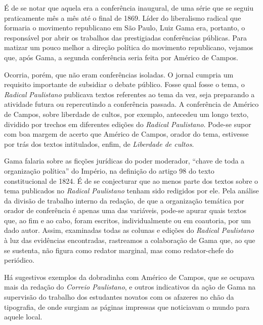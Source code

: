 É de se notar que aquela era a conferência inaugural, de uma série que
se seguiu praticamente mês a mês até o final de 1869. Líder do
liberalismo radical que formaria o movimento republicano em São Paulo,
Luiz Gama era, portanto, o responsável por abrir os trabalhos das
prestigiadas conferências públicas. Para matizar um pouco melhor a
direção política do movimento republicano, vejamos que, após Gama, a
segunda conferência seria feita por Américo de Campos.

Ocorria, porém, que não eram conferências isoladas. O jornal cumpria um
requisito importante de subsidiar o debate público. Fosse qual fosse o
tema, o \emph{Radical} \emph{Paulistano} publicava textos referentes ao
tema da vez, seja preparando a atividade futura ou repercutindo a
conferência passada. A conferência de Américo de Campos, sobre liberdade
de cultos, por exemplo, antecedeu um longo texto, dividido por trechos
em diferentes edições do \emph{Radical Paulistano}. Pode-se supor com
boa margem de acerto que Américo de Campos, orador do tema, estivesse
por trás dos textos intitulados, enfim, de \emph{Liberdade de cultos}.

Gama falaria sobre as ficções jurídicas do poder moderador, ``chave de
toda a organização política'' do Império, na definição do artigo 98 do
texto constitucional de 1824. É de se conjecturar que ao menos parte dos
textos sobre o tema publicados no \emph{Radical Paulistano} tenham sido
redigidos por ele. Pela análise da divisão de trabalho interno da
redação, de que a organização temática por orador de conferência é
apenas uma das variáveis, pode-se apurar quais textos que, ao fim e ao
cabo, foram escritos, individualmente ou em coautoria, por um dado
autor. Assim, examinadas todas as colunas e edições do \emph{Radical
Paulistano} à luz das evidências encontradas, rastreamos a colaboração
de Gama que, ao que se sustenta, não figura como redator marginal, mas
como redator-chefe do periódico.

Há sugestivos exemplos da dobradinha com Américo de Campos, que se
ocupava mais da redação do \emph{Correio Paulistano}, e outros
indicativos da ação de Gama na supervisão do trabalho dos estudantes
novatos com os afazeres no chão da tipografia, de onde surgiam as
páginas impressas que noticiavam o mundo para aquele local.

